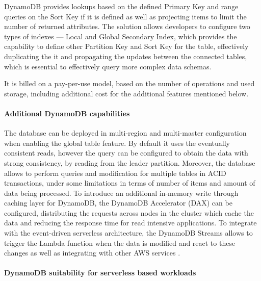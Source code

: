 DynamoDB provides lookups based on the defined Primary Key and range queries on the Sort Key if it is defined as well as projecting items to limit the number of returned attributes.
The solution allows developers to configure two types of indexes --- Local and Global Secondary Index, which provides the capability to define other Partition Key and Sort Key for the table, effectively duplicating the it and propagating the updates between the connected tables, which is essential to effectively query more complex data schemas.

It is billed on a pay-per-use model, based on the number of operations and used storage, including additional cost for the additional features mentioned below.

\paragraph{Additional DynamoDB capabilities}

The database can be deployed in multi-region and multi-master configuration when enabling the global table feature.
By default it uses the eventually consistent reads, however the query can be configured to obtain the data with strong consistency, by reading from the leader partition.
Moreover, the database allows to perform queries and modification for multiple tables in ACID transactions, under some limitations in terms of number of items and amount of data being processed.
To introduce an additional in-memory write through caching layer for DynamoDB, the DynamoDB Accelerator (DAX) can be configured, distributing the requests across nodes in the cluster which cache the data and reducing the response time for read intensive applications.
To integrate with the event-driven serverless architecture, the DynamoDB Streams allows to trigger the Lambda function when the data is modified and react to these changes as well as integrating with other AWS services \cite{DynamoDBFeatures}.

\paragraph{DynamoDB suitability for serverless based workloads}

